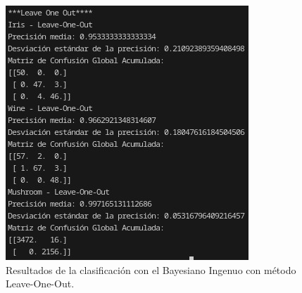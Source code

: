 \documentclass{article}
\begin{document}
    \begin{figure}[!h]
        \centering
        \includegraphics[scale=0.8]{Leave-one-out.jpg}
        \caption{Resultados de la clasificación con el Bayesiano Ingenuo con método Leave-One-Out.}
    \end{figure}
\end{document}
